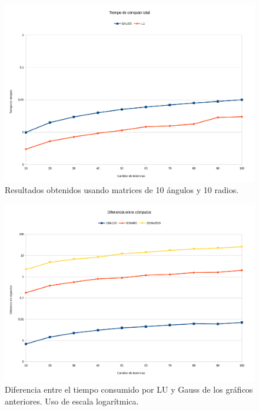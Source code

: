\begin{figure}[H]{}
\centering
\includegraphics[scale=0.5]{graphs/gaussVsLU3.pdf}
\caption{Resultados obtenidos usando matrices de 10 ángulos y 10 radios.}
\label{gaussVsLU3}
\end{figure}

\begin{figure}[H]{}
\centering
\includegraphics[scale=0.5]{graphs/dif.pdf}
\caption{Diferencia entre el tiempo consumido por LU y Gauss de los gráficos anteriores. Uso de escala logarítmica.}
\label{gaussVsLU4}
\end{figure}


